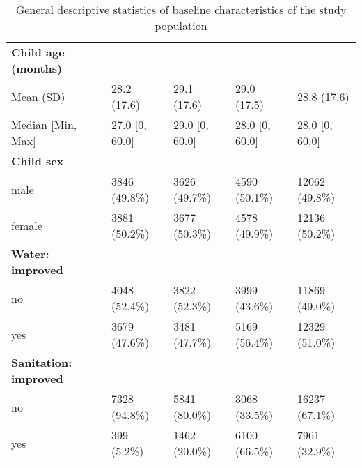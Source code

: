 \begin{table}[h!]
{\begin{tabular}{lllll}
    \textbf{Child age (months)} & & & &  \\						
    Mean (SD) &	28.2 (17.6) &	29.1 (17.6) &	29.0 (17.5) & 28.8 (17.6) \\
    Median [Min, Max] &	27.0 [0, 60.0] &	29.0 [0, 60.0] & 28.0 [0, 60.0]	& 28.0 [0, 60.0] \\ \hline
    \textbf{Child sex} & & & &  \\						
    male &	3846 (49.8\%) &	3626 (49.7\%) &	4590 (50.1\%) & 12062 (49.8\%) \\
    female &	3881 (50.2\%) &	3677 (50.3\%) &	4578 (49.9\%) & 12136 (50.2\%) \\ \hline
    \textbf{Water: improved} & & & &  \\						
    no &	4048 (52.4\%) &	3822 (52.3\%) &	3999 (43.6\%) & 11869 (49.0\%) \\
    yes &	3679 (47.6\%) &	3481 (47.7\%) &	5169 (56.4\%) & 12329 (51.0\%) \\ \hline
    \textbf{Sanitation: improved} & & & &  \\						
    no &	7328 (94.8\%) &	5841 (80.0\%) &	3068 (33.5\%) & 16237 (67.1\%) \\
    yes &	399 (5.2\%) &	1462 (20.0\%) &	6100 (66.5\%) & 7961 (32.9\%) \\ \hline
    \end{tabular}
  }
  \caption{General descriptive statistics of baseline characteristics of the study population}
  \label{table:descriptive_gen}
\end{table}

